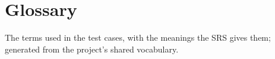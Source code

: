 \section{Glossary}\label{app:glossary}
The terms used in the test cases, with the meanings the SRS gives them; generated from the project's shared vocabulary.

{\small

}
